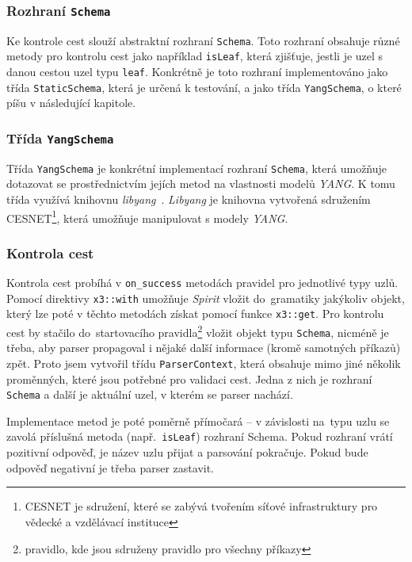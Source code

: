 \documentclass[thesis=B,czech,hidelinks]{FITthesis}[2019/03/06]
\begin{document}
\subsubsection{Rozhraní \texttt{Schema}}
Ke kontrole cest slouží abstraktní rozhraní \texttt{Schema}. Toto rozhraní obsahuje různé metody pro kontrolu cest jako například \texttt{isLeaf}, která zjišťuje, jestli je uzel s danou cestou uzel typu \texttt{leaf}. Konkrétně je toto rozhraní implementováno jako třída \texttt{StaticSchema}, která je určená k testování, a jako třída \texttt{YangSchema}, o které píšu v následující kapitole.

\subsubsection{Třída \texttt{YangSchema}}
Třída \texttt{YangSchema} je konkrétní implementací rozhraní \texttt{Schema}, která umožňuje dotazovat se prostřednictvím jejích metod na vlastnosti modelů \textit{YANG}. K tomu třída využívá knihovnu \textit{libyang}~\cite{libyang}. \textit{Libyang} je knihovna vytvořená sdružením CESNET\footnote{CESNET je sdružení, které se zabývá tvořením síťové infrastruktury pro vědecké a vzdělávací instituce}, která umožňuje manipulovat s modely \textit{YANG}.

\subsubsection{Kontrola cest}\label{path:checking}
Kontrola cest probíhá v \verb¨on_success¨ metodách pravidel pro jednotlivé typy uzlů. Pomocí direktivy \texttt{x3::with} umožňuje \textit{Spirit} vložit do~gramatiky jakýkoliv objekt, který lze poté v těchto metodách získat pomocí funkce \texttt{x3::get}. Pro kontrolu cest by stačilo do~startovacího pravidla\footnote{pravidlo, kde jsou sdruženy pravidlo pro všechny příkazy} vložit objekt typu \texttt{Schema}, nicméně je třeba, aby parser propagoval i nějaké další informace (kromě samotných příkazů) zpět. Proto jsem vytvořil třídu \texttt{ParserContext}, která obsahuje mimo jiné několik proměnných, které jsou potřebné pro validaci cest. Jedna z nich je rozhraní \texttt{Schema} a další je aktuální uzel, v kterém se parser nachází.

Implementace metod je poté poměrně přímočará -- v závislosti na~typu uzlu se zavolá příslušná metoda (např.\ \texttt{isLeaf}) rozhraní Schema. Pokud rozhraní vrátí pozitivní odpověď, je název uzlu přijat a parsování pokračuje. Pokud bude odpověď negativní je třeba parser zastavit.
\end{document}
